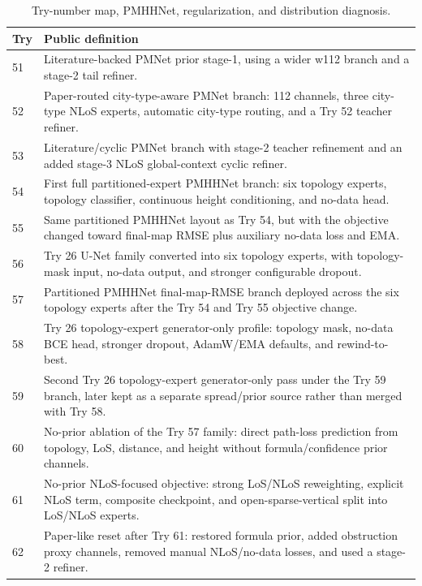 \begin{table}[H]
\centering
\caption{Try-number map, PMHHNet, regularization, and distribution diagnosis.}
\label{tab:try_map_pmhhnet}
\scriptsize
\renewcommand{\arraystretch}{1.06}
\begin{tabularx}{\textwidth}{p{}>{\raggedright\arraybackslash}X}
\toprule
Try & Public definition \\
\midrule
51 & Literature-backed PMNet prior stage-1, using a wider w112 branch and a stage-2 tail refiner. \\
52 & Paper-routed city-type-aware PMNet branch: 112 channels, three city-type NLoS experts, automatic city-type routing, and a Try 52 teacher refiner. \\
53 & Literature/cyclic PMNet branch with stage-2 teacher refinement and an added stage-3 NLoS global-context cyclic refiner. \\
54 & First full partitioned-expert PMHHNet branch: six topology experts, topology classifier, continuous height conditioning, and no-data head. \\
55 & Same partitioned PMHHNet layout as Try 54, but with the objective changed toward final-map RMSE plus auxiliary no-data loss and EMA. \\
56 & Try 26 U-Net family converted into six topology experts, with topology-mask input, no-data output, and stronger configurable dropout. \\
57 & Partitioned PMHHNet final-map-RMSE branch deployed across the six topology experts after the Try 54 and Try 55 objective change. \\
58 & Try 26 topology-expert generator-only profile: topology mask, no-data BCE head, stronger dropout, AdamW/EMA defaults, and rewind-to-best. \\
59 & Second Try 26 topology-expert generator-only pass under the Try 59 branch, later kept as a separate spread/prior source rather than merged with Try 58. \\
60 & No-prior ablation of the Try 57 family: direct path-loss prediction from topology, LoS, distance, and height without formula/confidence prior channels. \\
61 & No-prior NLoS-focused objective: strong LoS/NLoS reweighting, explicit NLoS term, composite checkpoint, and open-sparse-vertical split into LoS/NLoS experts. \\
62 & Paper-like reset after Try 61: restored formula prior, added obstruction proxy channels, removed manual NLoS/no-data losses, and used a stage-2 refiner. \\

\end{tabularx}
\end{table}
